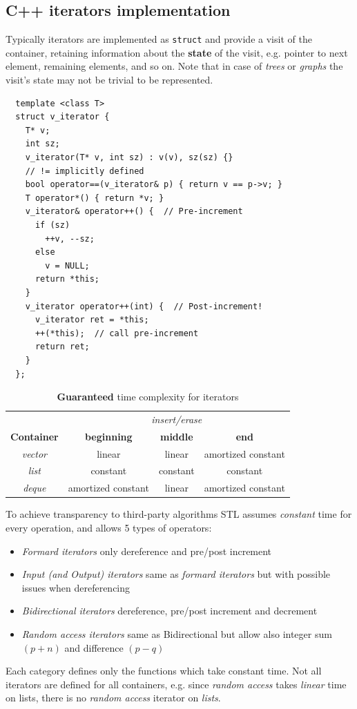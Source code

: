 \subsection{C++ iterators implementation}
Typically iterators are implemented as \lstinline|struct| and provide a visit of the container,
retaining information about the \textbf{state} of the visit, e.g. pointer to next element, remaining elements, and so on.
Note that in case of \textit{trees} or \textit{graphs} the visit's state may not be trivial to be represented.
\begin{lstlisting}
  template <class T>
  struct v_iterator {
    T* v;
    int sz;
    v_iterator(T* v, int sz) : v(v), sz(sz) {}
    // != implicitly defined
    bool operator==(v_iterator& p) { return v == p->v; }
    T operator*() { return *v; }
    v_iterator& operator++() {  // Pre-increment
      if (sz)
        ++v, --sz;
      else
        v = NULL;
      return *this;
    }
    v_iterator operator++(int) {  // Post-increment!
      v_iterator ret = *this;
      ++(*this);  // call pre-increment
      return ret;
    }
  };
\end{lstlisting}

\setlength{\heavyrulewidth}{1.5pt}
\setlength{\abovetopsep}{4pt}
\begin{table}[!htbp]
  \centering
  \begin{tabular}{c|c|c|c}
    \toprule
    & \multicolumn{3}{c}{\textit{insert/erase}}\\
    \textbf{Container} & \textbf{beginning} & \textbf{middle} & \textbf{end} \\
    \midrule
    \textit{vector}  & linear              & linear    & amortized constant\\
    \textit{list}    & constant            & constant  & constant\\
    \textit{deque}   & amortized constant  & linear    & amortized constant\\
    \hline
  \end{tabular}
  \caption{\textbf{Guaranteed} time complexity for iterators}
\end{table}

To achieve transparency to third-party algorithms STL assumes \textit{constant} time for every operation, and allows 5 types of operators:
\begin{itemize}
  \item \textit{Formard iterators} only dereference and pre/post increment
  \item \textit{Input (and Output) iterators} same as \textit{formard iterators} but with possible issues when dereferencing
  \item \textit{Bidirectional iterators} dereference, pre/post increment and decrement
  \item \textit{Random access iterators} same as Bidirectional but allow also integer sum $(p + n)$ and difference $(p - q)$
\end{itemize}
Each category defines only the functions which take constant time. Not all iterators are defined for all
containers, e.g. since \textit{random access} takes \textit{linear} time on lists,
there is no \textit{random access} iterator on \textit{lists}.

